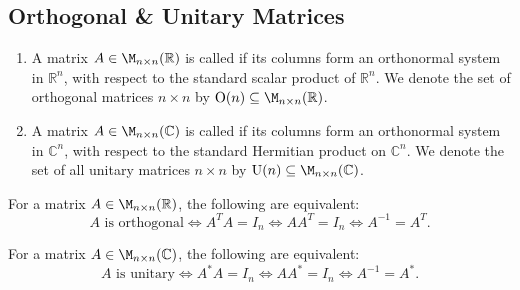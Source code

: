 \subsection{Orthogonal \& Unitary Matrices}

\begin{definition}
\label{def:orthogonal_unitary_matrices}
\begin{enumerate}
    \item A matrix $A \in \M_{n \times n}(\mathbb{R})$ is called  if its columns form an orthonormal system in $\mathbb{R}^n$, with respect to the standard scalar product of $\mathbb{R}^n$. We denote the set of orthogonal matrices $n \times n$ by $\operatorname{O}(n) \subseteq \M_{n \times n}(\mathbb{R})$.
    \item A matrix $A \in \M_{n \times n}(\mathbb{C})$ is called  if its columns form an orthonormal system in $\mathbb{C}^n$, with respect to the standard Hermitian product on $\mathbb{C}^n$. We denote the set of all unitary matrices $n \times n$ by $\operatorname{U}(n) \subseteq \M_{n \times n}(\mathbb{C})$.
\end{enumerate}
\end{definition}

\begin{lemma}
\label{lem:char_orthogonal_matrices}
For a matrix $A \in \M_{n \times n}(\mathbb{R})$, the following are equivalent:
\[ A \text{ is orthogonal} \iff A^T A = I_n \iff A A^T = I_n \iff A^{-1} = A^T. \]
\end{lemma}

\begin{lemma}
\label{lem:char_unitary_matrices}
For a matrix $A \in \M_{n \times n}(\mathbb{C})$, the following are equivalent:
\[ A \text{ is unitary} \iff A^* A = I_n \iff A A^* = I_n \iff A^{-1} = A^*. \]
\end{lemma}

